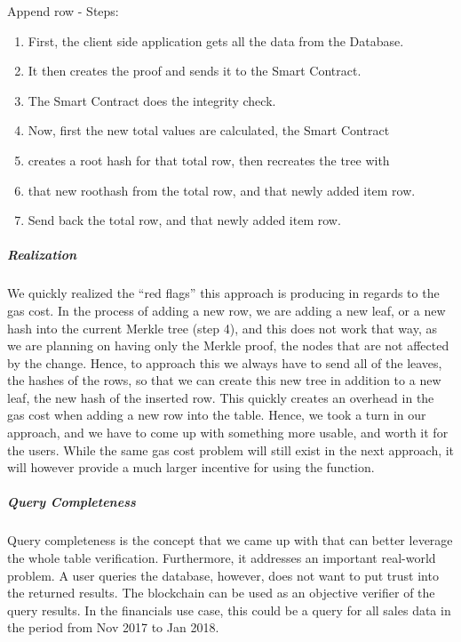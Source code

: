Append row - Steps:
\begin{enumerate}
\item First, the client side application gets all the data from the Database.
\item It then creates the proof and sends it to the Smart Contract.
\item The Smart Contract does the integrity check. 
\item Now, first the new total values are calculated, the Smart Contract 
\item creates a root hash for that total row, then recreates the tree with 
\item that new roothash from the total row, and that newly added item row. 
\item Send back the total row, and that newly added item row. 
\end{enumerate}

\subparagraph{Realization}

We quickly realized the “red flags” this approach is producing in regards to the gas cost. In the process of adding a new row, we are adding a new leaf, or a new hash into the current Merkle tree (step 4), and this does not work that way, as we are planning on having only the Merkle proof, the nodes that are not affected by the change. Hence, to approach this we always have to send all of the leaves, the hashes of the rows, so that we can create this new tree in addition to a new leaf, the new hash of the inserted row. This quickly creates an overhead in the gas cost when adding a new row into the table. Hence, we took a turn in our approach, and we have to come up with something more usable, and worth it for the users. While the same gas cost problem will still exist in the next approach, it will however provide a much larger incentive for using the function. 

\subparagraph{Query Completeness}

Query completeness is the concept that we came up with that can better leverage the whole table verification. Furthermore, it addresses an important real-world problem. A user queries the database, however, does not want to put trust into the returned results. The blockchain can be used as an objective verifier of the query results. In the financials use case, this could be a query for all sales data in the period from Nov 2017 to Jan 2018. 


